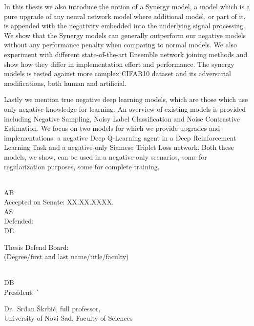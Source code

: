 \begin{tabbing}
\begin{minipage}[t]{.8\textwidth}
In this thesis we also introduce the notion of a Synergy model, a model which is a pure upgrade of any neural network model where additional model, or part of it, is appended with the negativity embedded into the underlying signal processing. We show that the Synergy models can generally outperform our negative models without any performance penalty when comparing to normal models. We also experiment with different state-of-the-art Ensemble network joining methods and show how they differ in implementation effort and performance. The synergy models is tested against more complex CIFAR10 dataset and its adversarial modifications, both human and artificial.

Lastly we mention true negative deep learning models, which are those which use only negative knowledge for learning. An overview of existing models is provided including Negative Sampling, Noisy Label Classification and Noise Contrastive Estimation. We focus on two models for which we provide upgrades and implementations: a negative Deep Q-Learning agent in a Deep Reinforcement Learning Task and a negative-only Siamese Triplet Loss network. Both these models, we show, can be used in a negative-only scenarios, some for regularization purposes, some for complete training.
    \end{minipage}                                          \\
  AB                       \>                               \\
  Accepted on Senate: \>   XX.XX.XXXX.      \\
  AS                       \>                               \\
  Defended:                \>                        \\
  DE                       \>                               \\
  \begin{minipage}[t]{.7\textwidth}
    Thesis Defend Board:\\
    \hspace*{\parindent}(Degree/first and last name/title/faculty)
  \end{minipage}\>             \\
  DB                       \>                               \\
  President: \`
    \begin{minipage}[t]{.7\textwidth}
    Dr.~Srđan Škrbić, full professor,\\
    University of Novi Sad, Faculty of Sciences

\end{minipage}
\end{tabbing}
